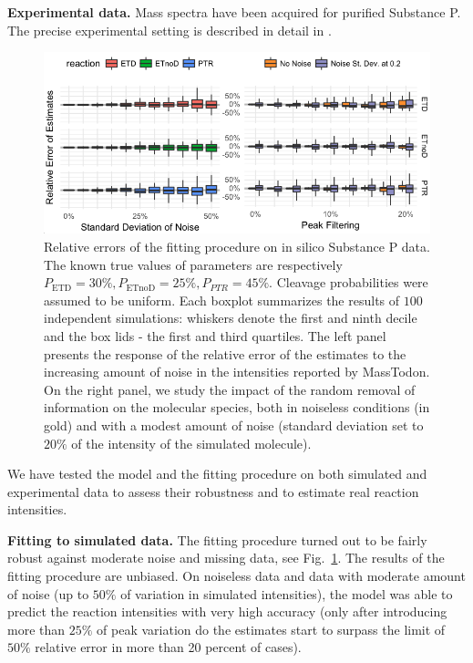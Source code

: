 \documentclass{llncs}
\begin{document}
\textbf{Experimental data.} Mass spectra have been acquired for purified Substance P. The precise experimental setting is described in detail in \cite{Lermyte2015-eb}.
\begin{figure}[h]
        \center
        \includegraphics[width=.9\textwidth]{kokos.png}
        \caption{ Relative errors of the fitting procedure on in silico Substance P data. The known true values of parameters are respectively $P_\text{ETD}=30\%, P_\text{ETnoD}= 25\%, P_{PTR}= 45\%$. Cleavage probabilities were assumed to be uniform. Each boxplot summarizes the results of $100$ independent simulations: whiskers denote the first and ninth decile and the box lids - the first and third quartiles. The left panel presents the response of the relative error of the estimates to the increasing amount of noise in the intensities reported by {\sc MassTodon}. On the right panel, we study the impact of the random removal of information on the molecular species, both in noiseless conditions (in gold) and with a modest amount of noise (standard deviation set to $20\%$ of the intensity of the simulated molecule).
        }\label{fig::kokos}
\end{figure}

We have tested the model and the fitting procedure on both simulated and experimental data to assess their robustness and to estimate real reaction intensities.

\textbf{Fitting to simulated data.} The fitting procedure turned out to be fairly robust against moderate noise and missing data, see Fig.~\ref{fig::kokos}. The results of the fitting procedure are unbiased. On noiseless data and data with moderate amount of noise (up to $50\%$ of variation in simulated intensities), the model was able to predict the reaction intensities with very high accuracy (only after introducing more than $25\%$ of peak variation do the estimates start to surpass the limit of $50\%$ relative error in more than 20 percent of cases).
\end{document}
